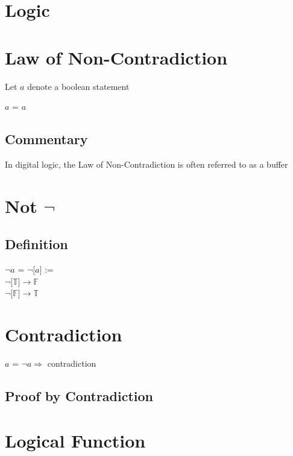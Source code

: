 \documentclass[11pt]{article}
\begin{document}
\section*{Logic}



\section{Law of Non-Contradiction}
Let $a$ denote a boolean statement
\begin{center}
$a$ = $a$
\end{center}
\subsection{Commentary}
In digital logic, the Law of Non-Contradiction is often referred to as a buffer




\section{Not $\lnot$}
\subsection{Definition}
\begin{center}
$\lnot a$ = $\lnot \lbrack a \rbrack$ :=\\
\vspace{2mm}
$\lnot \lbrack \mathbb{T} \rbrack \rightarrow \mathbb{F}$\\
\vspace{2mm}
$\lnot \lbrack \mathbb{F} \rbrack \rightarrow \mathbb{T}$
\end{center}





\section{Contradiction}
\begin{center}
$a$ = $\lnot a \Rightarrow$ contradiction
\end{center}
\subsection{Proof by Contradiction}





\newpage
\section{Logical Function}
\end{document}
